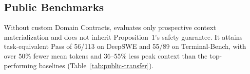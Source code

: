 \subsection{Public Benchmarks}
\begin{table}[tb]
    \centering
    \footnotesize
    \setlength{\tabcolsep}{4pt}
    \caption{Public transfer (three trials/task): task-equivalent Pass and trial-mean Token/Peak context.}
    \label{tab:public-transfer}
\end{table}
Without custom Domain Contracts, \methodCRI{} evaluates only prospective context materialization and does not inherit Proposition~1's safety guarantee.
It attains task-equivalent Pass of 56/113 on DeepSWE and 55/89 on Terminal-Bench, with over 50\% fewer mean tokens and 36--55\% less peak context than the top-performing baselines (Table~\ref{tab:public-transfer}).
